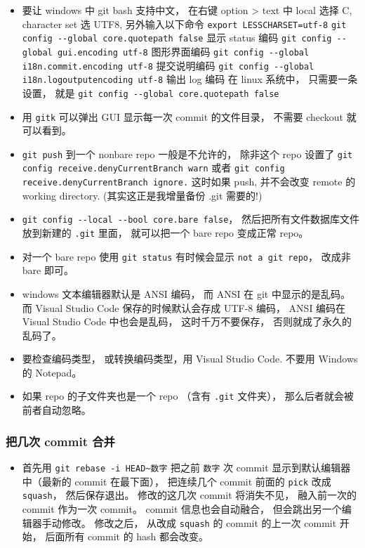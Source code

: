 \begin{itemize}
\item 要让 windows 中 git bash 支持中文， 在右键 option > text 中 local 选择 C, character set 选 UTF8, 另外输入以下命令
\verb|export LESSCHARSET=utf-8|
\verb|git config --global core.quotepath false|     显示 status 编码
\verb|git config --global gui.encoding utf-8|    图形界面编码
\verb|git config --global i18n.commit.encoding utf-8|   提交说明编码
\verb|git config --global i18n.logoutputencoding utf-8| 输出 log 编码
在 linux 系统中， 只需要一条设置， 就是
\verb|git config --global core.quotepath false|
\item 用 \verb|gitk| 可以弹出 GUI 显示每一次 commit 的文件目录， 不需要 checkout 就可以看到。
\item \verb|git push| 到一个 nonbare repo 一般是不允许的， 除非这个 repo 设置了 \verb|git config receive.denyCurrentBranch warn| 或者 \verb|git config receive.denyCurrentBranch ignore.| 这时如果 push, 并不会改变 remote 的 working directory. (其实这正是我增量备份 .git 需要的!)
\item \verb|git config --local --bool core.bare false|， 然后把所有文件数据库文件放到新建的 \verb|.git| 里面， 就可以把一个 bare repo 变成正常 repo。
\item 对一个 bare repo 使用 \verb|git status| 有时候会显示 \verb|not a git repo|， 改成非 bare 即可。
\item windows 文本编辑器默认是 ANSI 编码， 而 ANSI 在 git 中显示的是乱码。 而 Visual Studio Code 保存的时候默认会存成 UTF-8 编码， ANSI 编码在 Visual Studio Code 中也会是乱码， 这时千万不要保存， 否则就成了永久的乱码了。
\item 要检查编码类型， 或转换编码类型，用 Visual Studio Code.  不要用 Windows 的 Notepad。
\item 如果 repo 的子文件夹也是一个 repo （含有 \verb|.git| 文件夹）， 那么后者就会被前者自动忽略。
\end{itemize}

\subsubsection{把几次 commit 合并}
\begin{itemize}
\item 首先用 \verb|git rebase -i HEAD~数字| 把之前 \verb|数字| 次 commit 显示到默认编辑器中（最新的 commit 在最下面）， 把连续几个 commit 前面的 \verb|pick| 改成 \verb|squash|， 然后保存退出。 修改的这几次 commit 将消失不见， 融入前一次的 commit 作为一次 commit。 commit 信息也会自动融合， 但会跳出另一个编辑器手动修改。 修改之后， 从改成 \verb|squash| 的 commit 的上一次 commit 开始， 后面所有 commit 的 hash 都会改变。
\end{itemize}


